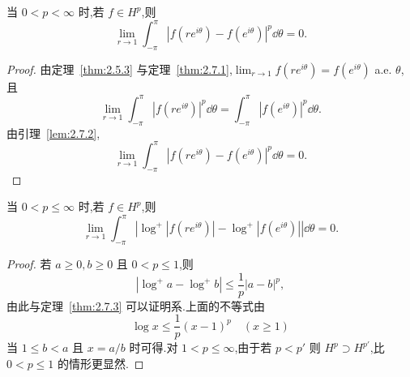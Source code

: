 \begin{theorem}\label{thm:2.7.3}
当 $0 < p < \infty$ 时,若 $f \in H^{p}$,则
\begin{equation*}
\lim_{r \to 1}\int_{-\pi}^{\pi}|f(re^{i\theta}) - f(e^{i\theta})|^{p}\dd\theta = 0.
\end{equation*}
\end{theorem}

\begin{proof}
由定理~\ref{thm:2.5.3} 与定理~\ref{thm:2.7.1},$\lim_{r \to 1}f(re^{i\theta}) = f(e^{i\theta})$ a.e. $\theta$,且
\begin{equation*}
\lim_{r \to 1}\int_{-\pi}^{\pi}|f(re^{i\theta})|^{p}\dd\theta = \int_{-\pi}^{\pi}|f(e^{i\theta})|^{p}\dd\theta.
\end{equation*}
由引理~\ref{lem:2.7.2},
\begin{equation*}
\lim_{r \to 1}\int_{-\pi}^{\pi}|f(re^{i\theta}) - f(e^{i\theta})|^{p}\dd\theta = 0.
\end{equation*}
\end{proof}

\begin{corollary}\label{cor:2.7.4}
当 $0 < p \leq \infty$ 时,若 $f \in H^{p}$,则
\begin{equation*}
\lim_{r \to 1}\int_{-\pi}^{\pi}\left|\log^{+}|f(re^{i\theta})| - \log^{+}|f(e^{i\theta})|\right|\dd\theta = 0.
\end{equation*}
\end{corollary}

\begin{proof}
若 $a \geq 0, b \geq 0$ 且 $0 < p \leq 1$,则
\begin{equation*}
\left|\log^{+}a - \log^{+}b\right| \leq \frac{1}{p}|a - b|^{p},
\end{equation*}
由此与定理~\ref{thm:2.7.3} 可以证明系.上面的不等式由
\begin{equation*}
\log x \leq \frac{1}{p}(x - 1)^{p} \quad (x \geq 1)
\end{equation*}
当 $1 \leq b < a$ 且 $x = a/b$ 时可得.对 $1 < p \leq \infty$,由于若 $p < p'$ 则 $H^{p} \supset H^{p'}$,比 $0 < p \leq 1$ 的情形更显然.
\end{proof}
